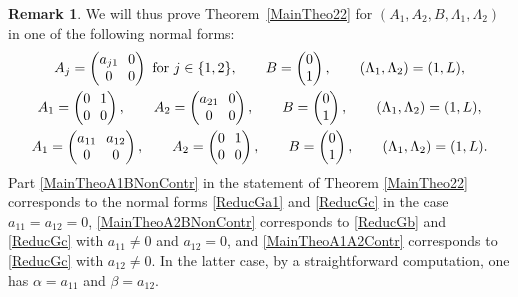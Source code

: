 \documentclass[10pt]{amsart}
\theoremstyle{plain}
\theoremstyle{definition}
\newtheorem{remk}[theo]{Remark}
\begin{document}
\begin{remk}
We will thus prove Theorem~\ref{MainTheo22} for $(A_1, A_2, B, \Lambda_1, \Lambda_2) $ in one of the following normal forms:
\begin{gather}
\label{ReducGa1}\arraycolsep3.5pt
A_j = \begin{pmatrix}
a_{j1} & 0 \\
0 & 0 \\
\end{pmatrix} \text{ for } j \in \{1, 2\}, \qquad B = \begin{pmatrix}
0 \\
1 \\
\end{pmatrix}, \qquad (\Lambda_1, \Lambda_2) = (1, L),
\\
\label{ReducGb}\arraycolsep3.5pt
A_1 = \begin{pmatrix}
0 & 1 \\
0 & 0 \\
\end{pmatrix}, \qquad A_2 = \begin{pmatrix}
a_{21} & 0 \\
0 & 0 \\
\end{pmatrix}, \qquad B = \begin{pmatrix}
0 \\
1 \\
\end{pmatrix}, \qquad (\Lambda_1, \Lambda_2) = (1, L),
\\
\label{ReducGc}\arraycolsep3.5pt
A_1 = \begin{pmatrix}
a_{11} & a_{12} \\
0 & 0 \\
\end{pmatrix}, \qquad A_2 = \begin{pmatrix}
0 & 1 \\
0 & 0 \\
\end{pmatrix}, \qquad B = \begin{pmatrix}
0 \\
1 \\
\end{pmatrix}, \qquad (\Lambda_1, \Lambda_2) = (1, L).
\end{gather}
Part \eqref{MainTheoA1BNonContr} in the statement of Theorem \ref{MainTheo22} corresponds to the normal forms \eqref{ReducGa1} and \eqref{ReducGc} in the case $a_{11} = a_{12} = 0$, \eqref{MainTheoA2BNonContr} corresponds to \eqref{ReducGb} and \eqref{ReducGc} with $a_{11} \neq 0$ and $a_{12} = 0$, and \eqref{MainTheoA1A2Contr} corresponds to \eqref{ReducGc} with $a_{12} \neq 0$. In the latter case, by a straightforward computation, one has $\alpha = a_{11}$ and $\beta = a_{12}$.
\end{remk}
\end{document}

